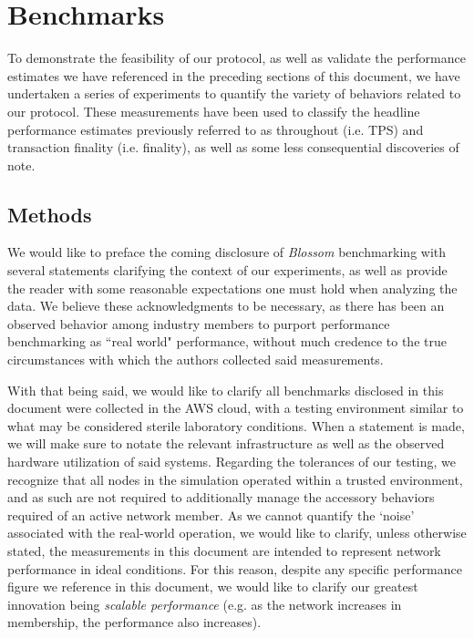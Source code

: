 \section{Benchmarks}\label{bench}
To demonstrate the feasibility of our protocol, as well as validate the performance estimates we have referenced in the preceding sections of this document, we have undertaken a series of experiments to quantify the variety of behaviors related to our protocol. These measurements have been used to classify the headline performance estimates previously referred to as throughout (i.e. TPS) and transaction finality (i.e. finality), as well as some less consequential discoveries of note.

\subsection{Methods}\label{bench:met}
We would like to preface the coming disclosure of \textit{Blossom} benchmarking with several statements clarifying the context of our experiments, as well as provide the reader with some reasonable expectations one must hold when analyzing the data. We believe these acknowledgments to be necessary, as there has been an observed behavior among industry members to purport performance benchmarking as “real world" performance, without much credence to the true circumstances with which the authors collected said measurements. 

With that being said, we would like to clarify all benchmarks disclosed in this document were collected in the AWS cloud, with a testing environment similar to what may be considered sterile laboratory conditions. When a statement is made, we will make sure to notate the relevant infrastructure as well as the observed hardware utilization of said systems. Regarding the tolerances of our testing, we recognize that all nodes in the simulation operated within a trusted environment, and as such are not required to additionally manage the accessory behaviors required of an active network member. As we cannot quantify the ‘noise’ associated with the real-world operation, we would like to clarify, unless otherwise stated, the measurements in this document are intended to represent network performance in ideal conditions. For this reason, despite any specific performance figure we reference in this document, we would like to clarify our greatest innovation being \textit{scalable performance} (e.g. as the network increases in membership, the performance also increases).

